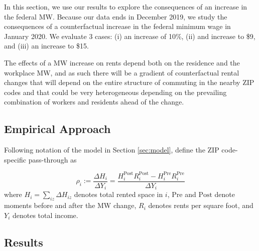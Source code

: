 
In this section, we use our results to explore the consequences of an increase
in the federal MW.
Because our data ends in December 2019, we study the consequences of a 
counterfactual increase in the federal minimum wage in January 2020. We
evaluate 3 cases: (i) an increase of 10\%, (ii) and increase to \$9, and 
(iii) an increase to \$15. 


The effects of a MW increase on rents depend both on the residence and
the workplace MW, and as such there will be a gradient of counterfactual 
rental changes that will depend on the entire structure of commuting in the nearby 
ZIP codes and that could be very heterogeneous depending on the prevailing combination
of workers and residents ahead of the change.



\subsection{Empirical Approach}

Following notation of the model in Section \ref{sec:model}, define the ZIP code-
specific pass-through as

\begin{equation}\label{eq:pass_through}
    \rho_i := \frac{\Delta H_i}{\Delta Y_i} 
            = \frac{H^{\text{Post}}_i R^{\text{Post}}_i - H^{\text{Pre}}_i R^{\text{Pre}}_i}{\Delta Y_i}
\end{equation}
where $H_i = \sum_{iz}\Delta H_{iz}$ denotes total rented space in $i$, 
$\text{Pre}$ and $\text{Post}$ denote moments before and after the MW change,
$R_i$ denotes rents per square foot, and 
$Y_i$ denotes total income.



\subsection{Results}


